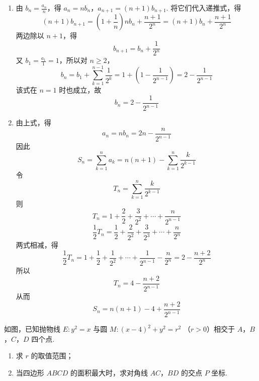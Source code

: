 \begin{solution}
\begin{enumerate}
\item 由 \(b_n=\frac{a_n}{n}\)，得 \(a_n=nb_n\)，\(a_{n+1}=(n+1)b_{n+1}\). 将它们代入递推式，得
\[
(n+1)b_{n+1}=\left(1+\frac{1}{n}\right)nb_n+\frac{n+1}{2^n}
=(n+1)b_n+\frac{n+1}{2^n}
\]
两边除以 \(n+1\)，得
\[
b_{n+1}=b_n+\frac{1}{2^n}
\]
又 \(b_1=\frac{a_1}{1}=1\)，所以对 \(n\geqslant2\)，
\[
b_n=b_1+\sum_{k=1}^{n-1}\frac{1}{2^k}
=1+\left(1-\frac{1}{2^{n-1}}\right)
=2-\frac{1}{2^{n-1}}
\]
该式在 \(n=1\) 时也成立，故
\[
b_n=2-\frac{1}{2^{n-1}}
\]

\item 由上式，得
\[
a_n=nb_n=2n-\frac{n}{2^{n-1}}
\]
因此
\[
S_n=\sum_{k=1}^{n}a_k
=n(n+1)-\sum_{k=1}^{n}\frac{k}{2^{k-1}}
\]
令
\[
T_n=\sum_{k=1}^{n}\frac{k}{2^{k-1}}
\]
则
\[
T_n=1+\frac{2}{2}+\frac{3}{2^2}+\cdots+\frac{n}{2^{n-1}}
\]
\[
\frac{1}{2}T_n=\frac{1}{2}+\frac{2}{2^2}+\frac{3}{2^3}+\cdots+\frac{n}{2^n}
\]
两式相减，得
\[
\frac{1}{2}T_n=1+\frac{1}{2}+\frac{1}{2^2}+\cdots+\frac{1}{2^{n-1}}-\frac{n}{2^n}
=2-\frac{n+2}{2^n}
\]
所以
\[
T_n=4-\frac{n+2}{2^{n-1}}
\]
从而
\[
S_n=n(n+1)-4+\frac{n+2}{2^{n-1}}
\]
\end{enumerate}
\end{solution}

\begin{problem}
如图，已知抛物线 \(E: y^{2} = x\) 与圆 \(M: \left(x - 4\right)^{2} + y^{2} = r^{2}\) （\(r > 0\)）相交于 \(A\)，\(B\)，\(C\)，\(D\) 四个点.

\begin{enumerate}
\item 求 \(r\) 的取值范围；
\item 当四边形 \(ABCD\) 的面积最大时，求对角线 \(AC\)，\(BD\) 的交点 \(P\) 坐标.
\end{enumerate}

\end{problem}

